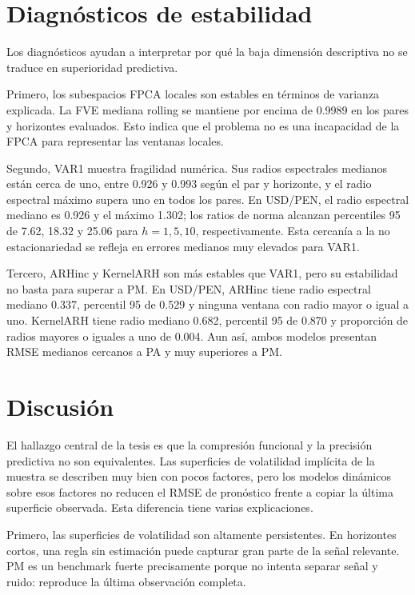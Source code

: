 \documentclass[a4paper,11pt]{article}
\newcommand{\SVIs}{superficies de volatilidad implícita}
\begin{document}
\section{Diagnósticos de estabilidad}

Los diagnósticos ayudan a interpretar por qué la baja dimensión descriptiva no se traduce en superioridad predictiva.

Primero, los subespacios FPCA locales son estables en términos de varianza explicada. La FVE mediana rolling se mantiene por encima de 0.9989 en los pares y horizontes evaluados. Esto indica que el problema no es una incapacidad de la FPCA para representar las ventanas locales.

Segundo, VAR1 muestra fragilidad numérica. Sus radios espectrales medianos están cerca de uno, entre 0.926 y 0.993 según el par y horizonte, y el radio espectral máximo supera uno en todos los pares. En USD/PEN, el radio espectral mediano es 0.926 y el máximo 1.302; los ratios de norma alcanzan percentiles 95 de 7.62, 18.32 y 25.06 para \(h=1,5,10\), respectivamente. Esta cercanía a la no estacionariedad se refleja en errores medianos muy elevados para VAR1.

Tercero, ARHinc y KernelARH son más estables que VAR1, pero su estabilidad no basta para superar a PM. En USD/PEN, ARHinc tiene radio espectral mediano 0.337, percentil 95 de 0.529 y ninguna ventana con radio mayor o igual a uno. KernelARH tiene radio mediano 0.682, percentil 95 de 0.870 y proporción de radios mayores o iguales a uno de 0.004. Aun así, ambos modelos presentan RMSE medianos cercanos a PA y muy superiores a PM.

\section{Discusión}

El hallazgo central de la tesis es que la compresión funcional y la precisión predictiva no son equivalentes. Las \SVIs{} de la muestra se describen muy bien con pocos factores, pero los modelos dinámicos sobre esos factores no reducen el RMSE de pronóstico frente a copiar la última superficie observada. Esta diferencia tiene varias explicaciones.

Primero, las superficies de volatilidad son altamente persistentes. En horizontes cortos, una regla sin estimación puede capturar gran parte de la señal relevante. PM es un benchmark fuerte precisamente porque no intenta separar señal y ruido: reproduce la última observación completa.
\end{document}
